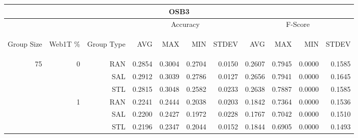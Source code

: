 \begin{center}
\begin{table}[htbp] 
 \begin{center}
\begin{tabular}{ | r | r | r | r | r | r | r | r | r | r | r |}
\hline
\multicolumn{11}{|c|}{OSB3}\\
\hline
 & & & \multicolumn{4}{|c|}{Accuracy} & \multicolumn{4}{|c|}{F-Score}\\ \cline{4-11}
\begin{sideways}Group Size\end{sideways} & \begin{sideways}Web1T \%\end{sideways} & \begin{sideways}Group Type\end{sideways} & \begin{sideways}AVG\end{sideways} & \begin{sideways}MAX\end{sideways} & \begin{sideways}MIN\end{sideways} & \begin{sideways}STDEV\end{sideways} & \begin{sideways}AVG\end{sideways} & \begin{sideways}MAX\end{sideways} & \begin{sideways}MIN\end{sideways} & \begin{sideways}STDEV\end{sideways}\\
\hline
\multirow{18}{*}{75}
 & \multirow{3}{*}{0} & RAN & 0.2854 & 0.3004 & 0.2704 & 0.0150 & 0.2607 & 0.7945 & 0.0000 & 0.1585\\ \cline{3-11}
 &   & SAL & 0.2912 & 0.3039 & 0.2786 & 0.0127 & 0.2656 & 0.7941 & 0.0000 & 0.1645\\ \cline{3-11}
 &   & STL & 0.2815 & 0.3048 & 0.2582 & 0.0233 & 0.2638 & 0.7887 & 0.0000 & 0.1585\\ \cline{2-11}
 & \multirow{3}{*}{1} & RAN & 0.2241 & 0.2444 & 0.2038 & 0.0203 & 0.1842 & 0.7364 & 0.0000 & 0.1536\\ \cline{3-11}
 &   & SAL & 0.2200 & 0.2427 & 0.1972 & 0.0228 & 0.1767 & 0.7042 & 0.0000 & 0.1510\\ \cline{3-11}
 &   & STL & 0.2196 & 0.2347 & 0.2044 & 0.0152 & 0.1844 & 0.6905 & 0.0000 & 0.1493\\ \cline{2-11}

\end{tabular}
\end{center}
\end{table}
\end{center}

